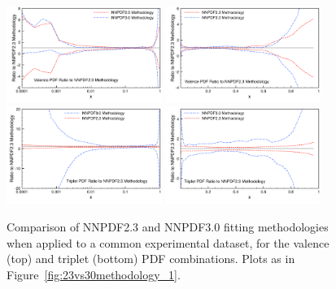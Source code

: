 \begin{figure}[!]
\centering
\includegraphics[width=0.45\textwidth]{7-PostLHC/figs/30meth/plots/vallog.pdf}
\includegraphics[width=0.45\textwidth]{7-PostLHC/figs/30meth/plots/vallin.pdf}\\
\includegraphics[width=0.45\textwidth]{7-PostLHC/figs/30meth/plots/t3log.pdf}
\includegraphics[width=0.45\textwidth]{7-PostLHC/figs/30meth/plots/t3lin.pdf}

\caption[Comparison of NNPDF2.3 and NNPDF3.0 fitting methodologies when applied to a common experimental dataset. Valence and triplet PDF combinations]{Comparison of NNPDF2.3 and NNPDF3.0 fitting methodologies when applied to a common experimental dataset, for the valence (top) and triplet (bottom) PDF combinations. Plots as in Figure~\ref{fig:23vs30methodology_1}.}
\label{fig:23vs30methodology_2}
\end{figure}